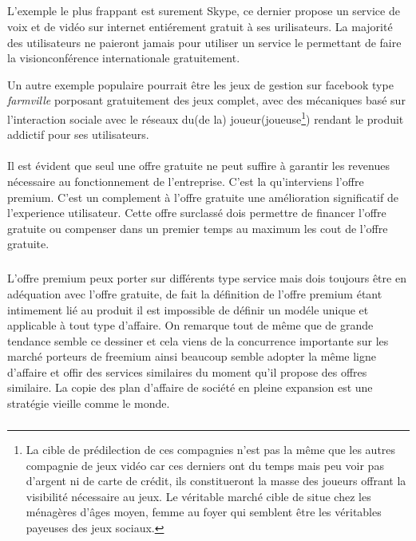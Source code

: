 \documentclass[11pt, a4paper ]{article}
\begin{document}
\subparagraph{} %
L'exemple le plus frappant est surement Skype, ce dernier propose un service de voix et de vidéo sur internet entiérement gratuit à ses urilisateurs. La majorité des utilisateurs ne paieront jamais pour utiliser un service le permettant de faire la visionconférence internationale gratuitement.

Un autre exemple populaire pourrait être les jeux de gestion sur facebook type \emph{farmville} porposant gratuitement des jeux complet, avec des mécaniques basé sur l'interaction sociale avec le réseaux du(de la) joueur(joueuse\footnote{La cible de prédilection de ces compagnies n'est pas la même que les autres compagnie de jeux vidéo car ces derniers ont du temps mais peu voir pas d'argent ni de carte de crédit, ils constitueront la masse des joueurs offrant la visibilité nécessaire au jeux. Le véritable marché cible de situe chez les ménagères d'âges moyen, femme au foyer qui semblent être les véritables payeuses des jeux sociaux. }) rendant le produit addictif pour ses utilisateurs.

\paragraph{} %
Il est évident que seul une offre gratuite ne peut suffire à garantir les revenues nécessaire au fonctionnement de l'entreprise. C'est la qu'interviens l'offre premium. C'est un complement à l'offre gratuite une amélioration significatif de l'experience utilisateur. Cette offre surclassé dois permettre de financer l'offre gratuite ou compenser dans un premier temps au maximum les cout de l'offre gratuite.
\subparagraph{}
L'offre premium peux porter sur différents type service mais dois toujours être en adéquation avec l'offre gratuite, de fait la définition de l'offre premium étant intimement lié au produit il est impossible de définir un modéle unique et applicable à tout type d'affaire. On remarque tout de même que de grande tendance semble ce dessiner et cela viens de la concurrence importante sur les marché porteurs de freemium ainsi beaucoup semble adopter la même ligne d'affaire et offir des services similaires du moment qu'il propose des offres similaire. La copie des plan d'affaire de société en pleine expansion est une stratégie vieille comme le monde.

\subparagraph{} %
\end{document}
